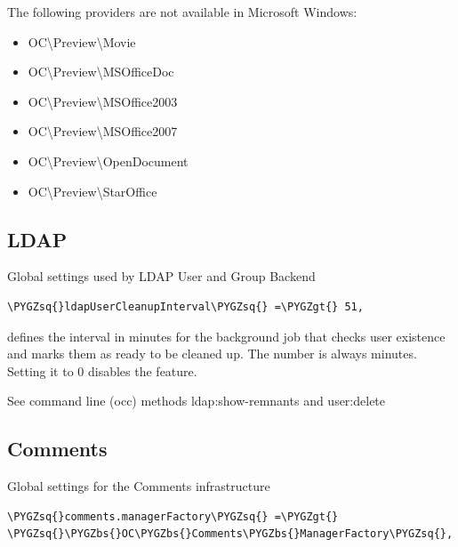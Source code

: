 \documentclass[letterpaper,10pt,english]{sphinxmanual}
\def\PYGZbs{\char`\\}
\def\PYGZgt{\char`\>}
\def\PYGZsq{\char`\'}
\begin{document}
The following providers are not available in Microsoft Windows:
\begin{itemize}
\item {} 
OC\textbackslash{}Preview\textbackslash{}Movie

\item {} 
OC\textbackslash{}Preview\textbackslash{}MSOfficeDoc

\item {} 
OC\textbackslash{}Preview\textbackslash{}MSOffice2003

\item {} 
OC\textbackslash{}Preview\textbackslash{}MSOffice2007

\item {} 
OC\textbackslash{}Preview\textbackslash{}OpenDocument

\item {} 
OC\textbackslash{}Preview\textbackslash{}StarOffice

\end{itemize}


\subsection{LDAP}
\label{configuration_server/config_sample_php_parameters:ldap}
Global settings used by LDAP User and Group Backend

\begin{Verbatim}[commandchars=\\\{\}]
\PYGZsq{}ldapUserCleanupInterval\PYGZsq{} =\PYGZgt{} 51,
\end{Verbatim}

defines the interval in minutes for the background job that checks user
existence and marks them as ready to be cleaned up. The number is always
minutes. Setting it to 0 disables the feature.

See command line (occ) methods ldap:show-remnants and user:delete


\subsection{Comments}
\label{configuration_server/config_sample_php_parameters:comments}
Global settings for the Comments infrastructure

\begin{Verbatim}[commandchars=\\\{\}]
\PYGZsq{}comments.managerFactory\PYGZsq{} =\PYGZgt{} \PYGZsq{}\PYGZbs{}OC\PYGZbs{}Comments\PYGZbs{}ManagerFactory\PYGZsq{},
\end{Verbatim}
\end{document}

